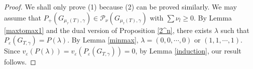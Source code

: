 \documentclass[10pt]{amsart}
\theoremstyle{theorems}
\begin{document}
\begin{proof}

We shall only prove (1) because (2) can be proved similarly. We may assume that $P_{+}(G_{\mu_{\tau}(T),\gamma})\in \mathcal P_{\nu}(G_{\mu_{\tau}(T),\gamma})$ with $\sum\nu_l\geq 0$. By Lemma \ref{maxtomax1} and the dual version of Proposition \ref{2^n}, there exists $\lambda$ such that $P_{\varepsilon}(G_{T,\gamma})=P(\lambda)$. By Lemma \ref{minmax}, $\lambda=(0,0,\cdots,0)$ or $(1,1,\cdots,1)$. Since $v_{\varepsilon}(P(\lambda))=v_{\varepsilon}(P_{\varepsilon}(G_{T,\gamma}))=0$, by Lemma \ref{induction}, our result follows.
%
%
%
%
%

\end{proof}
\end{document}
